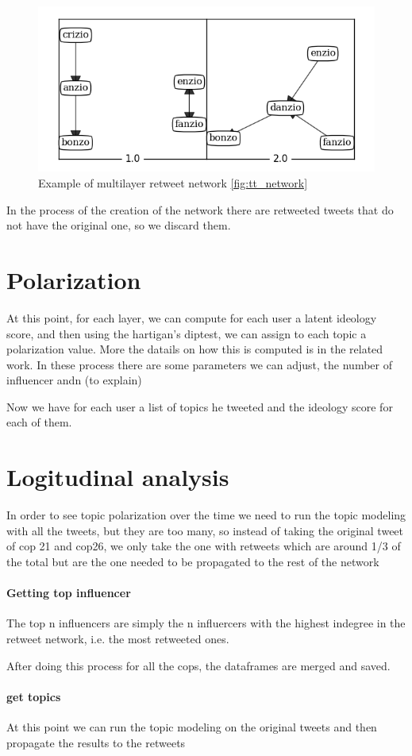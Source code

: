 \begin{figure}
    \centering
    \includegraphics[width=0.75\linewidth]{Chapter4/figures/projected_topics_ml.png}
    \caption{Example of multilayer retweet network \ref{fig:tt_network}}
    \label{fig:multilayer}
\end{figure}



In the process of the creation of the network there are retweeted tweets that do not have the original one, so we discard them.

\section{Polarization}
At this point, for each layer, we can compute for each user a latent ideology score, and then using the hartigan's diptest, we can assign to each topic a polarization value. More the datails on how this is computed is in the related work.
In these process there are some parameters we can adjust, the number of influencer andn (to explain)

Now we have for each user a list of topics he tweeted and the ideology score for each of them.

\section{Logitudinal analysis}
In order to see topic polarization over the time we need to run the topic modeling with all the tweets, but they are too many, so instead of taking the original tweet of cop 21 and cop26, we only take the one with retweets which are around 1/3 of the total but are the one needed to be propagated to the rest of the network

\paragraph{Getting top influencer}
The top n influencers are simply the n influercers with the highest indegree in the retweet network, i.e. the most retweeted ones.


After doing this process for all the cops, the dataframes are merged and saved.

\paragraph{get topics}
At this point we can run the topic modeling on the original tweets and then propagate the results to the retweets 
